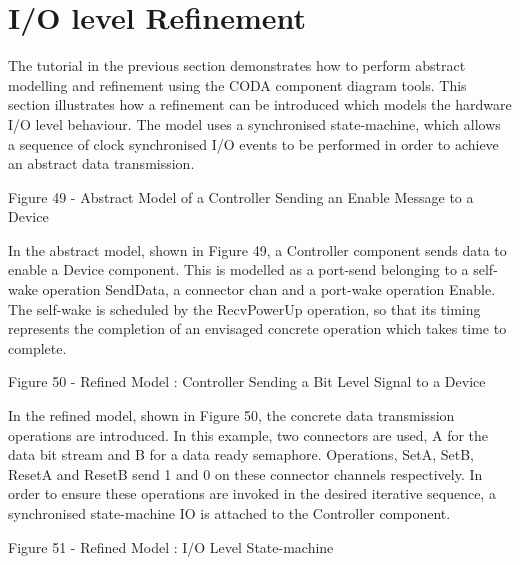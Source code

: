 \section{I/O level Refinement}
\label{sec:component_diagrams-ioLevel}

The tutorial in the previous section demonstrates how to perform abstract modelling and refinement using the CODA component diagram tools. This section illustrates how a refinement can be introduced which models the hardware I/O level behaviour. The model uses a synchronised state-machine, which allows a sequence of clock synchronised I/O events to be performed in order to achieve an abstract data transmission.


Figure 49 - Abstract Model of a Controller Sending an Enable Message to a Device 

In the abstract model, shown in Figure 49, a Controller component sends data to enable a Device component. This is modelled as a port-send belonging to a self-wake operation SendData, a connector chan and a port-wake operation Enable. The self-wake is scheduled by the RecvPowerUp operation, so that its timing represents the completion of an envisaged concrete operation which takes time to complete.

Figure 50 - Refined Model : Controller Sending a Bit Level Signal to a Device

In the refined model, shown in Figure 50, the concrete data transmission operations are introduced. In this example, two connectors are used, A for the data bit stream and B for a data ready semaphore. Operations, SetA, SetB, ResetA and ResetB send 1 and 0 on these connector channels respectively. In order to ensure these operations are invoked in the desired iterative sequence, a synchronised state-machine IO is attached to the Controller component. 

Figure 51 - Refined Model : I/O Level State-machine

